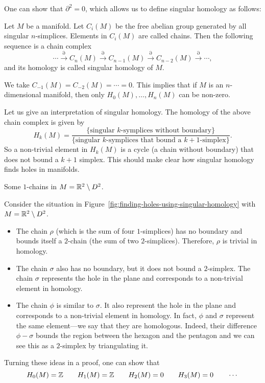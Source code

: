 One can show that $\partial^2 = 0$, which allows us to define singular homology as follows:
\begin{definition}
    Let $M$ be a manifold.
    Let $C_i(M)$ be the free abelian group generated by all singular  $n$-simplices.
    Elements in $C_i(M)$ are called chains.
    Then the following sequence is a chain complex
    \[
        \cdots \xrightarrow{\partial} C_n(M) \xrightarrow{\partial}  C_{n-1}(M) \xrightarrow{\partial}  C_{n-2}(M) \xrightarrow{\partial}  \cdots
    ,\] 
    and its homology is called singular homology of $M$.
\end{definition}
\begin{remark}
    We take $C_{-1}(M) = C_{-2}(M) = \cdots = 0$.
    This implies that if $M$ is an $n$-dimensional manifold, then only $H_0(M), \ldots, H_n(M)$ can be non-zero.
\end{remark}
Let us give an interpretation of singular homology.
The homology of the above chain complex is given by
\[
    H_k(M) = \frac{\{ \text{singular $k$-symplices without boundary}\}}{\{\text{singular $k$-symplices that bound a $k+1$-simplex}\}}
.\] 
So a non-trivial element in $H_k(M)$ is a cycle (a chain without boundary) that does not bound a $k+1$ simplex.
This should make clear how singular homology finds holes in manifolds.
\begin{eg}
    \begin{marginfigure}
        \centering
        \caption{Some $1$-chains in $M = \mathbb{R}^2 \setminus D^2$.}
        \label{fig:finding-holes-using-singular-homology}
    \end{marginfigure}

    Consider the situation in Figure~\ref{fig:finding-holes-using-singular-homology} with $M = \mathbb{R}^2 \setminus D^2$.
    \begin{itemize}
        \item The chain $\rho$ (which is the sum of four $1$-simplices) has no boundary and bounds itself a $2$-chain (the sum of two $2$-simplices).
            Therefore, $\rho$ is trivial in homology.
        \item The chain $\sigma$ also has no boundary, but it does not bound a $2$-simplex. The chain $\sigma$ represents the hole in the plane and corresponds to a non-trivial element in homology.
        \item The chain $\phi$ is similar to $\sigma$. It also represent the hole in the plane and corresponds to a non-trivial element in homology.
            In fact, $\phi$ and  $\sigma$ represent the same element---we say that they are homologous.
            Indeed, their difference $\phi - \sigma$ bounds the region between the hexagon and the pentagon and we can see this as a $2$-simplex by triangulating it.
    \end{itemize}
    Turning these ideas in a proof, one can show that
    \[
        H_0(M) = \mathbb{Z} \qquad 
        H_1(M) = \mathbb{Z} \qquad 
        H_2(M) = 0 \qquad
        H_3(M) = 0 \qquad \cdots
    \] 
\end{eg}
